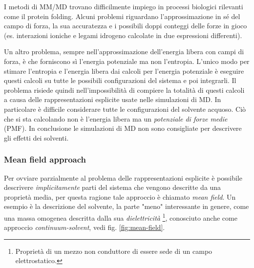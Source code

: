 {\par I metodi di MM/MD trovano difficilmente impiego in processi biologici rilevanti come il protein folding. Alcuni problemi riguardano l'approssimazione in sé del campo di forza, la sua accuratezza e i possibili doppi conteggi delle forze in gioco (es. interazioni ioniche e legami idrogeno calcolate in due espressioni differenti). 

\par Un altro problema, sempre nell'approssimazione dell'energia libera con campi di forza, è che forniscono sì l'energia potenziale ma non l'entropia. L'unico modo per stimare l'entropia e l'energia libera dai calcoli per l'energia potenziale è eseguire questi calcoli su tutte le possibili configurazioni del sistema e poi integrarli. Il problema risiede quindi nell'impossibilità di compiere la totalità di questi calcoli a causa delle rappresentazioni esplicite usate nelle simulazioni di MD. In particolare è difficile considerare tutte le configurazioni del solvente acquoso. Ciò che si sta calcolando non è l'energia libera ma un \textit{potenziale di forze medie} (PMF). In conclusione le simulazioni di MD non sono consigliate per descrivere gli effetti dei solventi.

\subsubsection{Mean field approach}
Per ovviare parzialmente al problema delle rappresentazioni esplicite è possibile descrivere \textit{implicitamente} parti del sistema che vengono descritte da una proprietà media, per questa ragione tale approccio è chiamato \textit{mean field}. Un esempio è la descrizione del solvente, la parte "meno" interessante in genere, come una massa omogenea descritta dalla sua \textit{dielettricità} \footnote{Proprietà di un mezzo non conduttore di essere sede di un campo elettrostatico.}, conosciuto anche come approccio \textit{continuum-solvent}, vedi fig. \ref{fig:mean-field}.

}
